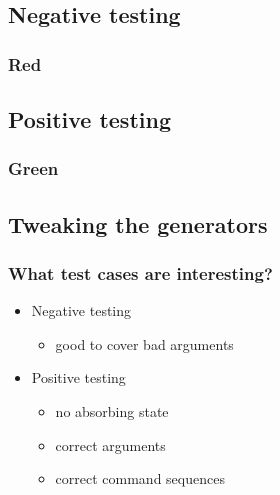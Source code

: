 \documentclass{beamer}
\begin{document}
\subsection{Negative testing}

\begin{frame}
  \frametitle{Red}
\end{frame}

\subsection{Positive testing}

\begin{frame}
  \frametitle{Green}
\end{frame}

\subsection{Tweaking the generators}

\begin{frame}
  \frametitle{What test cases are interesting?}
  \begin{itemize}
    \item Negative testing
    \begin{itemize}
      \item good to cover bad arguments
    \end{itemize}
    \item Positive testing
    \begin{itemize}
      \item no absorbing state
      \item correct arguments
      \item correct command sequences
    \end{itemize}
  \end{itemize}
\end{frame}
\end{document}
